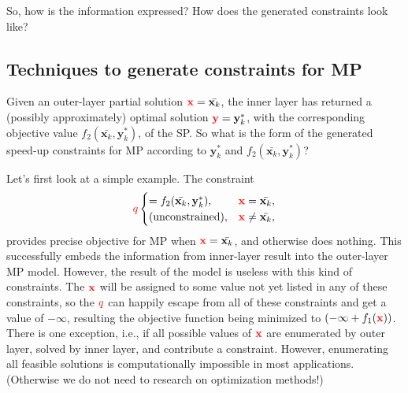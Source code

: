 \documentclass[twocolumn]{ctexart}
\begin{document}
So, how is the information expressed? How does the generated constraints look like?


\subsection{Techniques to generate constraints for MP}

Given an outer-layer partial solution $\mathbf{\color{red} x} = \bar{\mathbf{x}_k}$,
the inner layer has returned a (possibly approximately) optimal solution $\mathbf{\color{red} y} = \mathbf{y}^*_k$,
with the corresponding objective value $f_2(  \bar{\mathbf{x}_k}  ,  \mathbf{y}^*_k  )$,
of the SP.
So what is the form of the generated speed-up constraints for MP according to $\mathbf{y}^*_k$ and $f_2(  \bar{\mathbf{x}_k}  ,  \mathbf{y}^*_k  )$?



Let's first look at a simple example.
The constraint
\begin{equation}
    \begin{aligned}
        {\color{red} q}
        \begin{cases}
            = f_2(  \bar{\mathbf{x}_k}  ,  \mathbf{y}^*_k  ),  &  \mathbf{\color{red} x} =    \bar{\mathbf{x}_k}, \\
            \text{(unconstrained)}                         ,  &  \mathbf{\color{red} x} \neq \bar{\mathbf{x}_k}, \\
        \end{cases}
    \end{aligned}
\end{equation}
provides precise objective for MP when $\mathbf{\color{red} x} = \bar{\mathbf{x}_k}$, and otherwise does nothing.
%
%
This successfully embeds the information from inner-layer result into the outer-layer MP model.
However, the result of the model is useless with this kind of constraints.
The $\mathbf{\color{red} x}$ will be assigned to some value not yet listed in any of these constraints,
so the ${\color{red} q}$ can happily escape from all of these constraints and get a value of $-\infty$,
resulting the objective function being minimized to $( - \infty + f_1(  \mathbf{\color{red} x}  ) )$.
There is one exception, i.e., if all possible values of $\mathbf{\color{red} x}$ are enumerated by outer layer, solved by inner layer, and contribute a constraint.
However, enumerating all feasible solutions is computationally impossible in most applications. (Otherwise we do not need to research on optimization methods!)
\end{document}
